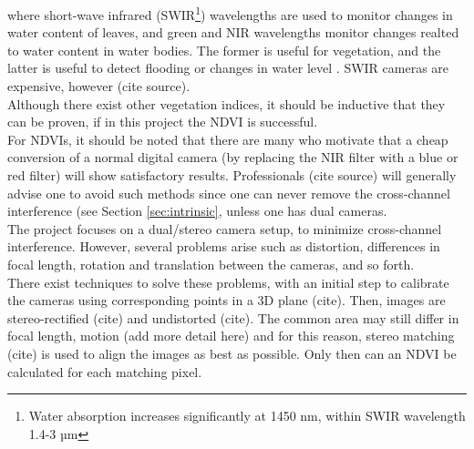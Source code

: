 where short-wave infrared (SWIR\footnote{Water absorption increases significantly at 1450 nm, within SWIR wavelength 1.4-3 µm}) wavelengths are used to monitor changes in water content of leaves, and green and NIR wavelengths monitor changes realted to water content in water bodies. The former is useful for vegetation, and the latter is useful to detect flooding or changes in water level \cite{ndwi}. SWIR cameras are expensive, however (cite source).\\

Although there exist other vegetation indices, it should be inductive that they can be proven, if in this project the NDVI is successful.\\

For NDVIs, it should be noted that there are many who motivate that a cheap conversion of a normal digital camera (by replacing the NIR filter with a blue or red filter) will show satisfactory results. Professionals (cite source) will generally advise one to avoid such methods since one can never remove the cross-channel interference (see Section \ref{sec:intrinsic}, unless one has dual cameras.\\

The project focuses on a dual/stereo camera setup, to minimize cross-channel interference. However, several problems arise such as distortion, differences in focal length, rotation and translation between the cameras, and so forth.\\

There exist techniques to solve these problems, with an initial step to calibrate the cameras using corresponding points in a 3D plane (cite). Then, images are stereo-rectified (cite) and undistorted (cite). The common area may still differ in focal length, motion (add more detail here) and for this reason, stereo matching (cite) is used to align the images as best as possible. Only then can an NDVI be calculated for each matching pixel.

